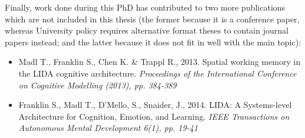 Finally, work done during this PhD has contributed to two more publications which are not included in this thesis (the former because it is a conference paper, whereas University policy requires alternative format theses to contain journal papers instead; and the latter because it does not fit in well with the main topic):

\nocite{madl2013spatial, franklin2013lida}

\begin{itemize}
	\item Madl T., Franklin S., Chen K. \& Trappl R., 2013. Spatial working memory in the LIDA cognitive architecture. \textit{Proceedings of the International Conference on Cognitive Modelling (2013), pp. 384-389}
	\item Franklin S., Madl T., D'Mello, S., Snaider, J., 2014. LIDA: A Systems-level Architecture for Cognition, Emotion, and Learning. \textit{IEEE Transactions on Autonomous Mental Development 6(1), pp. 19-41}
\end{itemize}